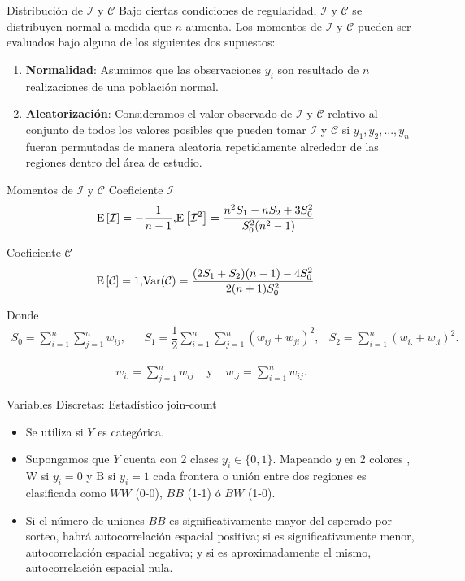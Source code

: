 \documentclass{beamer}
\def\Var{{\rm{Var}}}
\def\E{{\rm{E}}}
\begin{document}
\begin{frame}{Distribución de $\mathcal{I}$ y $\mathcal{C}$}
  Bajo ciertas condiciones de regularidad, $\mathcal{I}$ y $\mathcal{C}$ se distribuyen normal a medida que $n$ aumenta. Los momentos de $\mathcal{I}$ y $\mathcal{C}$ pueden ser evaluados bajo alguna de los siguientes dos supuestos:
  \begin{enumerate}
    \item \textbf{Normalidad}: Asumimos que las observaciones $y_i$ son resultado de $n$ realizaciones de una población normal.
    \item \textbf{Aleatorización}: Consideramos el valor observado de $\mathcal{I}$ y $\mathcal{C}$ relativo al conjunto de todos los valores posibles que pueden tomar $\mathcal{I}$ y $\mathcal{C}$ si $y_1, y_2, ..., y_n$ fueran permutadas de manera aleatoria repetidamente alrededor de las regiones dentro del área de estudio.
  \end{enumerate}
\end{frame}

\begin{frame}{Momentos de $\mathcal{I}$ y  $\mathcal{C}$}
  Coeficiente $\mathcal{I}$
  \begin{eqnarray}
  \E\left[\mathcal{I} \right] = -\dfrac{1}{n-1}, &
  \E\left[\mathcal{I}^2\right] =  \dfrac{n^2S_1-nS_2+3S_0^2}{S_0^2(n^2-1)}
  \end{eqnarray}

  Coeficiente $\mathcal{C}$
  \begin{eqnarray}
  \E\left[\mathcal{C}\right] = 1, & 
  \Var(\mathcal{C}) =\dfrac{(2S_1+S_2)(n-1)-4S_0^2}{2(n+1)S_0^2}
  \end{eqnarray}

  Donde 
  \begin{align}
    S_0 = \sum_{i=1}^n \sum_{j=1}^n w_{ij}, && S_1 = \dfrac{1}{2} \sum_{i=1}^n \sum_{j=1}^n  \left( w_{ij}+w_{ji} \right)^2, & S_2 = \sum_{i=1}^n  \left( w_{i.}+w_{.i} \right)^2. \nonumber
  \end{align}

  \begin{eqnarray}
  w_{i.} = \sum_{j=1}^n w_{ij} & \mbox{ y } & w_{.j} = \sum_{i=1}^n w_{ij}.\nonumber
  \end{eqnarray}
\end{frame}

\begin{frame}{Variables Discretas: Estadístico join-count}
  \begin{itemize}
  \item Se utiliza si $Y$ es categórica.
  \item Supongamos que $Y$ cuenta con 2 clases $y_{i}\in \lbrace 0,1 \rbrace$. Mapeando $y$ en 2 colores , W si $y_{i}=0$ y B si $y_{i}=1$ cada frontera o unión entre dos regiones es clasificada como $WW$ (0-0), $BB$ (1-1) ó $BW$ (1-0).
  \item Si el número de uniones $BB$ es significativamente mayor del esperado por sorteo, habrá autocorrelación espacial positiva;  si es significativamente menor, autocorrelación espacial negativa; y si es aproximadamente el mismo, autocorrelación espacial nula.
  \end{itemize}
\end{frame}
\end{document}
